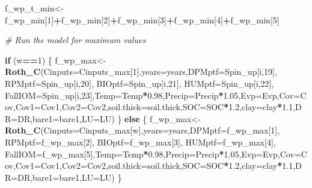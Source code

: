 \documentclass[
  10pt,
  b5paper,
]{book}
\newenvironment{Shaded}{\begin{snugshade}}{\end{snugshade}}
\newcommand{\CommentTok}[1]{\textcolor[rgb]{0.56,0.35,0.01}{\textit{#1}}}
\newcommand{\ControlFlowTok}[1]{\textcolor[rgb]{0.13,0.29,0.53}{\textbf{#1}}}
\newcommand{\DataTypeTok}[1]{\textcolor[rgb]{0.13,0.29,0.53}{#1}}
\newcommand{\DecValTok}[1]{\textcolor[rgb]{0.00,0.00,0.81}{#1}}
\newcommand{\FloatTok}[1]{\textcolor[rgb]{0.00,0.00,0.81}{#1}}
\newcommand{\KeywordTok}[1]{\textcolor[rgb]{0.13,0.29,0.53}{\textbf{#1}}}
\newcommand{\NormalTok}[1]{#1}
\newcommand{\OperatorTok}[1]{\textcolor[rgb]{0.81,0.36,0.00}{\textbf{#1}}}
\begin{document}
\begin{Shaded}
\begin{Highlighting}[]
{\NormalTok{f_wp_t_min<-f_wp_min[}\DecValTok{1}\NormalTok{]}\OperatorTok{+}\NormalTok{f_wp_min[}\DecValTok{2}\NormalTok{]}\OperatorTok{+}\NormalTok{f_wp_min[}\DecValTok{3}\NormalTok{]}\OperatorTok{+}\NormalTok{f_wp_min[}\DecValTok{4}\NormalTok{]}\OperatorTok{+}\NormalTok{f_wp_min[}\DecValTok{5}\NormalTok{]}

\CommentTok{# Run the model for maximum values}

\ControlFlowTok{if}\NormalTok{ (w}\OperatorTok{==}\DecValTok{1}\NormalTok{) \{}
\NormalTok{f_wp_max<-}\KeywordTok{Roth_C}\NormalTok{(}\DataTypeTok{Cinputs=}\NormalTok{Cinputs_max[}\DecValTok{1}\NormalTok{],}\DataTypeTok{years=}\NormalTok{years,}\DataTypeTok{DPMptf=}\NormalTok{Spin_up[i,}\DecValTok{19}\NormalTok{], }\DataTypeTok{RPMptf=}\NormalTok{Spin_up[i,}\DecValTok{20}\NormalTok{], }\DataTypeTok{BIOptf=}\NormalTok{Spin_up[i,}\DecValTok{21}\NormalTok{], }\DataTypeTok{HUMptf=}\NormalTok{Spin_up[i,}\DecValTok{22}\NormalTok{], }\DataTypeTok{FallIOM=}\NormalTok{Spin_up[i,}\DecValTok{23}\NormalTok{],}\DataTypeTok{Temp=}\NormalTok{Temp}\OperatorTok{*}\FloatTok{0.98}\NormalTok{,}\DataTypeTok{Precip=}\NormalTok{Precip}\OperatorTok{*}\FloatTok{1.05}\NormalTok{,}\DataTypeTok{Evp=}\NormalTok{Evp,}\DataTypeTok{Cov=}\NormalTok{Cov,}\DataTypeTok{Cov1=}\NormalTok{Cov1,}\DataTypeTok{Cov2=}\NormalTok{Cov2,}\DataTypeTok{soil.thick=}\NormalTok{soil.thick,}\DataTypeTok{SOC=}\NormalTok{SOC}\OperatorTok{*}\FloatTok{1.2}\NormalTok{,}\DataTypeTok{clay=}\NormalTok{clay}\OperatorTok{*}\FloatTok{1.1}\NormalTok{,}\DataTypeTok{DR=}\NormalTok{DR,}\DataTypeTok{bare1=}\NormalTok{bare1,}\DataTypeTok{LU=}\NormalTok{LU)}
\NormalTok{\} }\ControlFlowTok{else}\NormalTok{ \{}
\NormalTok{f_wp_max<-}\KeywordTok{Roth_C}\NormalTok{(}\DataTypeTok{Cinputs=}\NormalTok{Cinputs_max[w],}\DataTypeTok{years=}\NormalTok{years,}\DataTypeTok{DPMptf=}\NormalTok{f_wp_max[}\DecValTok{1}\NormalTok{], }\DataTypeTok{RPMptf=}\NormalTok{f_wp_max[}\DecValTok{2}\NormalTok{], }\DataTypeTok{BIOptf=}\NormalTok{f_wp_max[}\DecValTok{3}\NormalTok{], }\DataTypeTok{HUMptf=}\NormalTok{f_wp_max[}\DecValTok{4}\NormalTok{], }\DataTypeTok{FallIOM=}\NormalTok{f_wp_max[}\DecValTok{5}\NormalTok{],}\DataTypeTok{Temp=}\NormalTok{Temp}\OperatorTok{*}\FloatTok{0.98}\NormalTok{,}\DataTypeTok{Precip=}\NormalTok{Precip}\OperatorTok{*}\FloatTok{1.05}\NormalTok{,}\DataTypeTok{Evp=}\NormalTok{Evp,}\DataTypeTok{Cov=}\NormalTok{Cov,}\DataTypeTok{Cov1=}\NormalTok{Cov1,}\DataTypeTok{Cov2=}\NormalTok{Cov2,}\DataTypeTok{soil.thick=}\NormalTok{soil.thick,}\DataTypeTok{SOC=}\NormalTok{SOC}\OperatorTok{*}\FloatTok{1.2}\NormalTok{,}\DataTypeTok{clay=}\NormalTok{clay}\OperatorTok{*}\FloatTok{1.1}\NormalTok{,}\DataTypeTok{DR=}\NormalTok{DR,}\DataTypeTok{bare1=}\NormalTok{bare1,}\DataTypeTok{LU=}\NormalTok{LU)}
\NormalTok{\}}

}
\end{Highlighting}
\end{Shaded}
\end{document}
